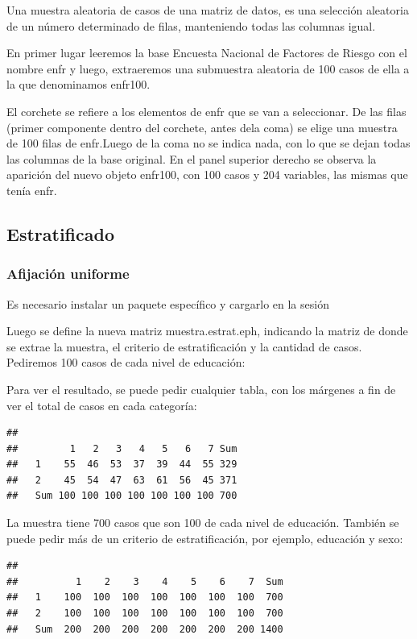 \documentclass[]{book}
\begin{document}
Una muestra aleatoria de casos de una matriz de datos, es una selección aleatoria de un número determinado de filas, manteniendo todas las columnas igual.

En primer lugar leeremos la base Encuesta Nacional de Factores de Riesgo con el nombre enfr y luego, extraeremos una submuestra aleatoria de 100 casos de ella a la que denominamos enfr100.

El corchete se refiere a los elementos de enfr que se van a seleccionar. De las filas (primer componente dentro del corchete, antes dela coma) se elige una muestra de 100 filas de enfr.Luego de la coma no se indica nada, con lo que se dejan todas las columnas de la base original. En el panel superior derecho se observa la aparición del nuevo objeto enfr100, con 100 casos y 204 variables, las mismas que tenía enfr.

\hypertarget{estratificado}{%
\subsection{Estratificado}\label{estratificado}}

\hypertarget{afijaciuxf3n-uniforme}{%
\subsubsection{Afijación uniforme}\label{afijaciuxf3n-uniforme}}

Es necesario instalar un paquete específico y cargarlo en la sesión

Luego se define la nueva matriz muestra.estrat.eph, indicando la matriz de donde se extrae la muestra, el criterio de estratificación y la cantidad de casos. Pediremos 100 casos de cada nivel de educación:

Para ver el resultado, se puede pedir cualquier tabla, con los márgenes a fin de ver el total de casos en cada categoría:

\begin{verbatim}
##      
##         1   2   3   4   5   6   7 Sum
##   1    55  46  53  37  39  44  55 329
##   2    45  54  47  63  61  56  45 371
##   Sum 100 100 100 100 100 100 100 700
\end{verbatim}

La muestra tiene 700 casos que son 100 de cada nivel de educación. También se puede pedir más de un criterio de estratificación, por ejemplo, educación y sexo:

\begin{verbatim}
##      
##          1    2    3    4    5    6    7  Sum
##   1    100  100  100  100  100  100  100  700
##   2    100  100  100  100  100  100  100  700
##   Sum  200  200  200  200  200  200  200 1400
\end{verbatim}
\end{document}
